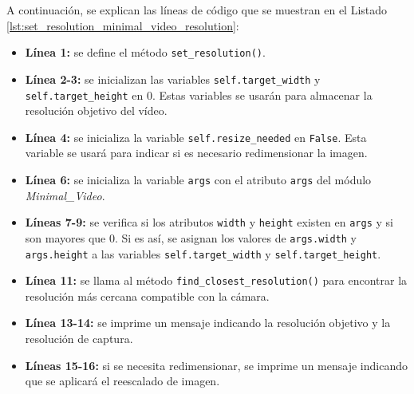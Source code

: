 A continuación, se explican las líneas de código que se muestran en el Listado \ref{lst:set_resolution_minimal_video_resolution}:
\begin{itemize}
    \item \textbf{Línea 1:} se define el método \texttt{set\_resolution()}.
    \item \textbf{Línea 2-3:} se inicializan las variables \texttt{self.target\_width} y \texttt{self.target\_height} en 0. Estas variables se usarán para almacenar la resolución objetivo del vídeo.
    \item \textbf{Línea 4:} se inicializa la variable \texttt{self.resize\_needed} en \texttt{False}. Esta variable se usará para indicar si es necesario redimensionar la imagen.
    \item \textbf{Línea 6:} se inicializa la variable \texttt{args} con el atributo \texttt{args} del módulo \textit{Minimal\_Video}.
    \item \textbf{Líneas 7-9:} se verifica si los atributos \texttt{width} y \texttt{height} existen en \texttt{args} y si son mayores que 0. Si es así, se asignan los valores de \texttt{args.width} y \texttt{args.height} a las variables \texttt{self.target\_width} y \texttt{self.target\_height}.
    \item \textbf{Línea 11:} se llama al método \texttt{find\_closest\_resolution()} para encontrar la resolución más cercana compatible con la cámara.
    \item \textbf{Línea 13-14:} se imprime un mensaje indicando la resolución objetivo y la resolución de captura.
    \item \textbf{Líneas 15-16:} si se necesita redimensionar, se imprime un mensaje indicando que se aplicará el reescalado de imagen.
\end{itemize}
\vspace{\baselineskip}

